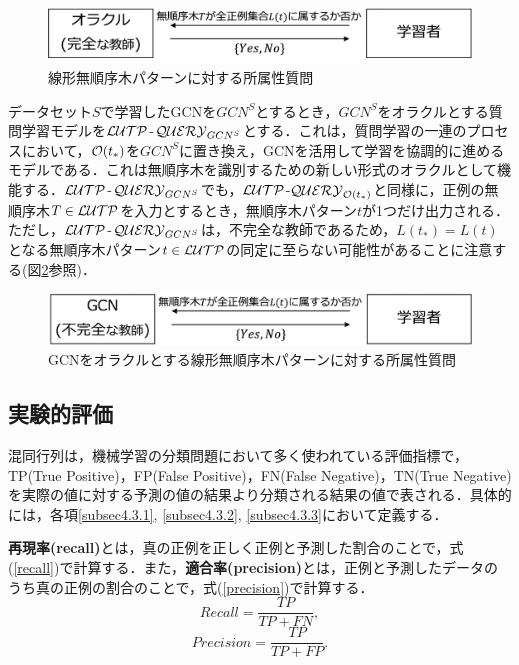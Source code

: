 \begin{figure}[tb]
  \centering
  \includegraphics[scale=0.29]{fig/fig-ql_oracle.eps}
  \caption{線形無順序木パターンに対する所属性質問}\label{fig:ql_oracle}
\end{figure}

データセット$S$で学習したGCNを$GCN^S$とするとき，$GCN^S$をオラクルとする質問学習モデルを${\cal LUTP}$-${\cal QUERY}_{GCN^S}$とする．これは，質問学習の一連のプロセスにおいて，${\cal O}(t_{\ast})$を$GCN^S$に置き換え，GCNを活用して学習を協調的に進めるモデルである．これは無順序木を識別するための新しい形式のオラクルとして機能する．${\cal LUTP}$-${\cal QUERY}_{GCN^S}$でも，${\cal LUTP}$-${\cal QUERY}_{{\cal O}(t_{\ast})}$と同様に，正例の無順序木$T\in {\cal LUTP}$を入力とするとき，無順序木パターン$t$が1つだけ出力される．ただし，${\cal LUTP}$-${\cal QUERY}_{GCN^S}$は，不完全な教師であるため，$L(t_{\ast})=L(t)$となる無順序木パターン$t\in{\cal LUTP}$の同定に至らない可能性があることに注意する(図\ref{fig:ql_gcn}参照)．

\begin{figure}[tb]
  \centering
  \includegraphics[scale=0.29]{fig/fig-ql_gcn.eps}
  \caption{GCNをオラクルとする線形無順序木パターンに対する所属性質問}\label{fig:ql_gcn}
\end{figure}

\subsection{実験的評価}
混同行列は，機械学習の分類問題において多く使われている評価指標で，TP(True Positive)，FP(False Positive)，FN(False Negative)，TN(True Negative)を実際の値に対する予測の値の結果より分類される結果の値で表される．具体的には，各項\ref{subsec4.3.1}, \ref{subsec4.3.2}, \ref{subsec4.3.3}において定義する．

\textbf{再現率(recall)}とは，真の正例を正しく正例と予測した割合のことで，式(\ref{recall})で計算する．また，\textbf{適合率(precision)}とは，正例と予測したデータのうち真の正例の割合のことで，式(\ref{precision})で計算する．
\begin{equation}
  \label{recall}
  Recall=\frac{TP}{TP+FN},
\end{equation}
\begin{equation}
  \label{precision}
  Precision=\frac{TP}{TP+FP}.
\end{equation}

